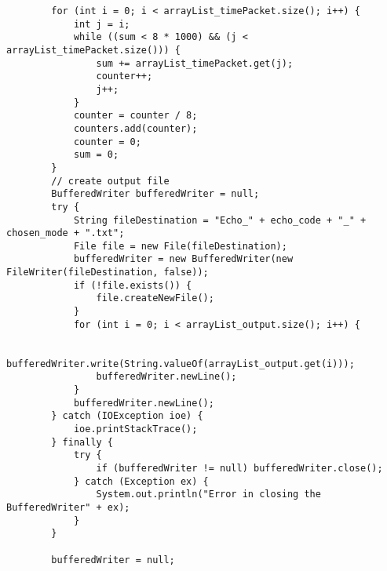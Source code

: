 \documentclass{article}
\begin{document}
\begin{lstlisting}
        for (int i = 0; i < arrayList_timePacket.size(); i++) {
            int j = i;
            while ((sum < 8 * 1000) && (j < arrayList_timePacket.size())) {
                sum += arrayList_timePacket.get(j);
                counter++;
                j++;
            }
            counter = counter / 8;
            counters.add(counter);
            counter = 0;
            sum = 0;
        }
        // create output file
        BufferedWriter bufferedWriter = null;
        try {
            String fileDestination = "Echo_" + echo_code + "_" + chosen_mode + ".txt";
            File file = new File(fileDestination);
            bufferedWriter = new BufferedWriter(new FileWriter(fileDestination, false));
            if (!file.exists()) {
                file.createNewFile();
            }
            for (int i = 0; i < arrayList_output.size(); i++) {

                bufferedWriter.write(String.valueOf(arrayList_output.get(i)));
                bufferedWriter.newLine();
            }
            bufferedWriter.newLine();
        } catch (IOException ioe) {
            ioe.printStackTrace();
        } finally {
            try {
                if (bufferedWriter != null) bufferedWriter.close();
            } catch (Exception ex) {
                System.out.println("Error in closing the BufferedWriter" + ex);
            }
        }

        bufferedWriter = null;


\end{lstlisting}
\end{document}
